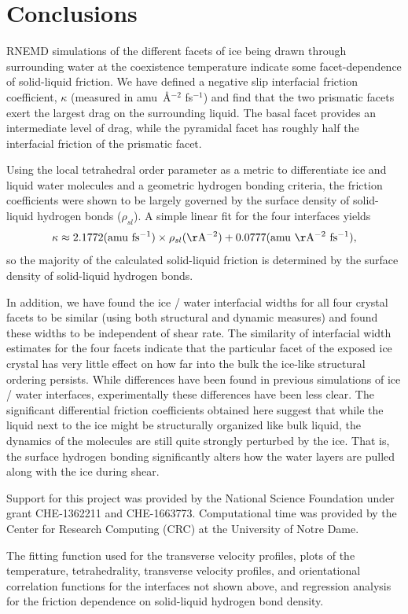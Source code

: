 \documentclass[journal = jpccck, manuscript = article]{achemso}
\begin{document}
\section{Conclusions}
RNEMD simulations of the different facets of ice being drawn through
surrounding water at the coexistence temperature indicate some
facet-dependence of solid-liquid friction.  We have defined a negative
slip interfacial friction coefficient, $\kappa$ (measured in
amu~\AA$^{-2}$ fs$^{-1}$) and find that the two prismatic facets exert
the largest drag on the surrounding liquid.  The basal facet provides
an intermediate level of drag, while the pyramidal facet has roughly
half the interfacial friction of the prismatic facet.

Using the local tetrahedral order parameter as a metric to
differentiate ice and liquid water molecules and a geometric hydrogen
bonding criteria, the friction coefficients were shown to be largely
governed by the surface density of solid-liquid hydrogen bonds
($\rho_{sl}$).  A simple linear fit for the four interfaces yields
\begin{equation}
\kappa \approx 2.1772 \mathrm{(amu~fs^{-1})} \times \rho_{sl} \mathrm{(\AA^{-2})}  + 0.0777 \mathrm{(amu~\AA^{-2}~fs^{-1})},
\end{equation}
so the majority of the calculated solid-liquid friction is determined
by the surface density of solid-liquid hydrogen bonds.

In addition, we have found the ice / water interfacial widths for all
four crystal facets to be similar (using both structural and dynamic
measures) and found these widths to be independent of shear rate.  The
similarity of interfacial width estimates for the four facets indicate
that the particular facet of the exposed ice crystal has very little
effect on how far into the bulk the ice-like structural ordering
persists.  While differences have been found in previous simulations
of ice / water interfaces\cite{Hayward2001,Hayward2002},
experimentally these differences have been less
clear.\cite{Beaglehole1993} The significant differential friction
coefficients obtained here suggest that while the liquid next to the
ice might be structurally organized like bulk liquid, the dynamics of
the molecules are still quite strongly perturbed by the ice.  That is,
the surface hydrogen bonding significantly alters how the water layers
are pulled along with the ice during shear.

\begin{acknowledgement}
  Support for this project was provided by the National Science
  Foundation under grant CHE-1362211 and CHE-1663773. Computational
  time was provided by the Center for Research Computing (CRC) at the
  University of Notre Dame.
\end{acknowledgement}

\begin{suppinfo}
  The fitting function used for the transverse velocity profiles,
  plots of the temperature, tetrahedrality, transverse velocity
  profiles, and orientational correlation functions for the interfaces
  not shown above, and regression analysis for the friction dependence
  on solid-liquid hydrogen bond density.
\end{suppinfo}

\newpage

\end{document}
